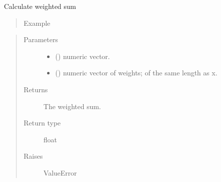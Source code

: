 \documentclass[letterpaper,10pt,english]{sphinxmanual}
\begin{document}

\begin{fulllineitems}
\label{\detokenize{_modules/lmrob:lmrob.utils.sumU}}
Calculate weighted sum
\begin{quote}\begin{description}
\item[{Example}] \leavevmode
\end{description}\end{quote}

%
\begin{sphinxVerbatim}[commandchars=\\\{\}]
\PYG{p}{[}\PYG{p}{]} \PYG{p}{[}\PYG{p}{]}
\end{sphinxVerbatim}
\begin{quote}\begin{description}
\item[{Parameters}] \leavevmode\begin{itemize}
\item {} 
 () \textendash{} numeric vector.

\item {} 
 () \textendash{} numeric vector of weights; of the same length as x.

\end{itemize}

\item[{Returns}] \leavevmode
The weighted sum.

\item[{Return type}] \leavevmode
float

\item[{Raises}] \leavevmode
ValueError

\end{description}\end{quote}

\end{fulllineitems}
\end{document}
